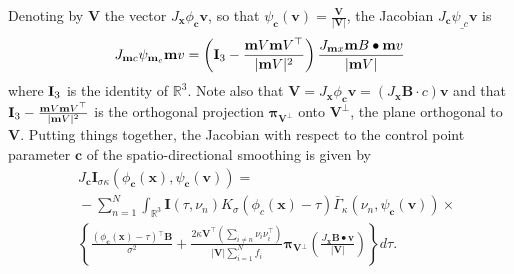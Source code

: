 \documentclass[twocolumn]{svjour3}
\begin{document}
Denoting by $\bm V$ the vector $J_{\bm x}\phi_{\bm c} \bm v$, so that $\psi_{\bm c}(\bm v) = \frac{\bm V}{|\bm V|}$,  the Jacobian $J_{\bm c}\psi_{\bm_c}\bm v$ is
\begin{equation}
    J_{{\bf m} c}\psi_{{\bf m}_c}{\bf m} v = \left({\bf I}_3 - \frac{{\bf m} V{\bf m} V^\top}{|{\bf m} V|^2}\right)\frac{J_{{\bf m} x}{\bf m} B\bullet {\bf m} v}{|{\bf m} V|}
\end{equation}
where ${\bf I}_3$ is the identity of $\mathbb R^3$. Note also that $\bm V = J_{\bm x}\phi_{\bm c} \bm v = \left(J_{\bm x}\bm B\cdot c\right)\bm v$ and that 
${\bf I}_3 - \frac{{\bf m} V{\bf m} V^\top}{|{\bf m} V|^2}$ is the orthogonal projection ${\bm \pi}_{\bm V^\bot}$ onto $\bm V^\bot$, the plane orthogonal to $\bm V$.  
Putting things together, the Jacobian with respect to the control point parameter $\bm c$ of the spatio-directional smoothing is given by
\begin{align}
   \! \!\!~&J_{\bm c}{\bm I}_{\sigma \kappa}(\phi_{\bm c}(\bm x), \psi_{\bm c}(\bm v)) =\nonumber\\
    &\!\!-\sum_{n=1}^N\int_{\mathbb R^3} \bm I(\tau, \nu_n)K_\sigma(\phi_{c}(\bm x)-\tau)\bar{\Gamma}_\kappa(\nu_n,\psi_{\bm c}(\bm v))\times\nonumber\\
   &\!\!\left\{\!\! \frac{(\phi_{\bm c}(\bm x)-\tau)\!^\top\!\!\bm B}{\sigma^2}\!+\!\!\frac{2\kappa \bm V^\top\!\!\left(\sum_{i\not=n}\nu_i\nu_i^\top\!\right)}{|\bm V|\sum_{i=1}^N f_i}
  {\bm \pi}\!_{\bm V\!^\bot}\!\!\left(\frac{J_{\bm x}\bm B\bullet \bm v}{|\bm V|}\right)  
  \!\! \right\}\!d\tau.
\end{align}
\end{document}
